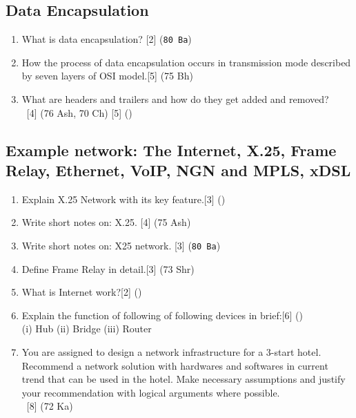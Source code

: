 \documentclass[12pt]{article}
\newcommand{\enter}{\\\textcolor{white}{1}}
\begin{document}
		\subsection{Data Encapsulation}
		\begin{enumerate}[noitemsep, topsep = 0pt]
			\item What is data encapsulation? \hfill [2] (\texttt{80 Ba})
			
			\item How the process of data encapsulation occurs in transmission mode described by seven layers of OSI model.\hfill[5] (75 Bh)

			\item What are headers and trailers and how do they get added and removed?
		\enter\hfill[4] (76 Ash, 70 Ch) [5] () 
		\end{enumerate}

		\subsection{Example network: The Internet, X.25, Frame Relay, Ethernet, VoIP, NGN and MPLS, xDSL}
		\begin{enumerate}[noitemsep, topsep = 0pt]
			\item Explain X.25 Network with its key feature.\hfill[3] ()

			\item Write short notes on: X.25. \hfill [4] (75 Ash)

			\item Write short notes on: X25 network. \hfill [3] (\texttt{80 Ba})

			\item Define Frame Relay in detail.\hfill[3] (73 Shr)

			\item What is Internet work?\hfill[2] ()

			\item Explain the function of following of following devices in brief:\hfill[6] ()\\
			(i) Hub (ii) Bridge (iii) Router
			
			\item You are assigned to design a network infrastructure for a 3-start hotel. Recommend a network solution with hardwares and softwares in current trend that can be used in the hotel. Make necessary assumptions and justify your recommendation with logical arguments where possible.
			\enter\hfill[8] (72 Ka)
		\end{enumerate}
\end{document}
